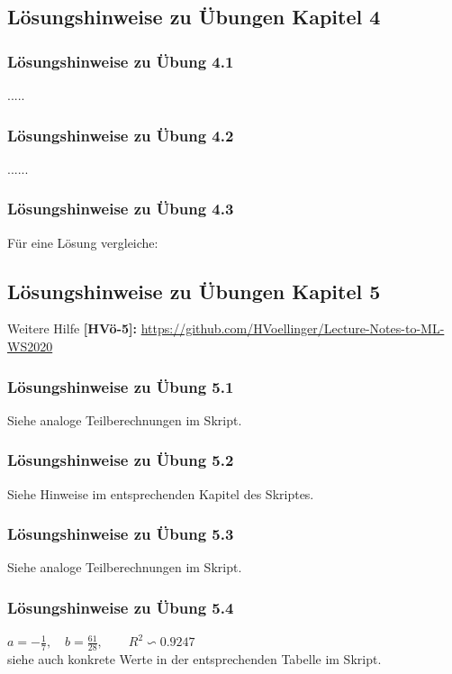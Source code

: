 \documentclass[12pt]{article}
\begin{document}
\newpage

\subsection{Lösungshinweise zu Übungen Kapitel 4}

\subsubsection{Lösungshinweise zu Übung 4.1}
.....\\
\subsubsection{Lösungshinweise zu Übung 4.2}
......\\
\subsubsection{Lösungshinweise zu Übung 4.3}

Für eine Lösung vergleiche:\\

\newpage

\subsection{Lösungshinweise zu Übungen Kapitel 5}
%
\hspace*{-0.3cm} Weitere Hilfe \textbf{[HVö-5]:} 
\url{https://github.com/HVoellinger/Lecture-Notes-to-ML-WS2020}
%
\subsubsection{Lösungshinweise zu Übung 5.1}
%
Siehe analoge Teilberechnungen im Skript.
%
\subsubsection{Lösungshinweise zu Übung 5.2}
%
Siehe Hinweise im entsprechenden Kapitel des Skriptes.  
%
\subsubsection{Lösungshinweise zu Übung 5.3}
%
Siehe analoge Teilberechnungen im Skript.
%
\subsubsection{Lösungshinweise zu Übung 5.4}
%
$ a = - \frac{1}{7}, \quad b =  \frac{61}{28}, \qquad R^2 \backsim 0.9247 $\\[0.2cm]
siehe auch konkrete Werte in der entsprechenden Tabelle im Skript.
%
\end{document}
